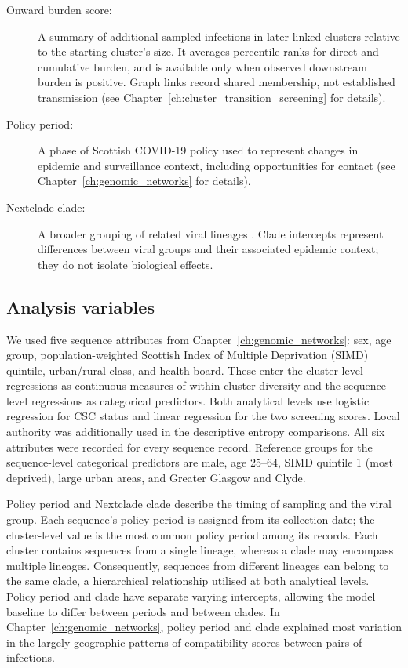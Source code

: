 \begin{tcolorbox}[
    breakable,
    title=\textbf{Glossary}: key terms used in this chapter,
    halign=right, 
    fontupper=\small
    ]
\begin{description}
    \item[Onward burden score:] A summary of additional sampled infections in later linked clusters relative to the starting cluster's size. It averages percentile ranks for direct and cumulative burden, and is available only when observed downstream burden is positive. Graph links record shared membership, not established transmission (see Chapter~\ref{ch:cluster_transition_screening} for details).
    \item[Policy period:] A phase of Scottish COVID-19 policy used to represent changes in epidemic and surveillance context, including opportunities for contact (see Chapter~\ref{ch:genomic_networks} for details).
    \item[Nextclade clade:] A broader grouping of related viral lineages \citep{Aksamentov2021}. Clade intercepts represent differences between viral groups and their associated epidemic context; they do not isolate biological effects.
\end{description}
\end{tcolorbox}

\subsection{Analysis variables}\label{sec:ch6_attributes}

We used five sequence attributes from Chapter~\ref{ch:genomic_networks}: sex, age group, population-weighted Scottish Index of Multiple Deprivation (SIMD) quintile, urban/rural class, and health board. These enter the cluster-level regressions as continuous measures of within-cluster diversity and the sequence-level regressions as categorical predictors. Both analytical levels use logistic regression for CSC status and linear regression for the two screening scores. Local authority was additionally used in the descriptive entropy comparisons. All six attributes were recorded for every sequence record. Reference groups for the sequence-level categorical predictors are male, age 25--64, SIMD quintile 1 (most deprived), large urban areas, and Greater Glasgow and Clyde.

Policy period and Nextclade clade describe the timing of sampling and the viral group. Each sequence's policy period is assigned from its collection date; the cluster-level value is the most common policy period among its records. Each cluster contains sequences from a single lineage, whereas a clade may encompass multiple lineages. Consequently, sequences from different lineages can belong to the same clade, a hierarchical relationship utilised at both analytical levels. Policy period and clade have separate varying intercepts, allowing the model baseline to differ between periods and between clades. In Chapter~\ref{ch:genomic_networks}, policy period and clade explained most variation in the largely geographic patterns of compatibility scores between pairs of infections.


